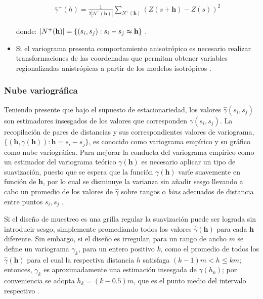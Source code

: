 \documentclass[
]{book}
\begin{document}
\begin{itemize}
  \begin{align}
      \bar{\gamma}^+(h)=\frac{1}{2|N^+(\textbf{h})|}\sum_{N^+(\textbf{h})}(Z(s+\textbf{h})-Z(s))^2  
    \end{align}

  donde: \(|N^+(\textbf{h})|=\{(s_i,s_j): s_i-s_j \thickapprox \textbf{h}\}\) \citep{montero}.
\item
  Si el variograma presenta comportamiento anisotrópico es necesario realizar transformaciones de las coordenadas que permitan obtener variables regionalizadas anistrópicas a partir de los modelos isotrópicos \citep{hans}.
\end{itemize}

\hypertarget{nube-variogruxe1fica}{%
\subsubsection*{Nube variográfica}\label{nube-variogruxe1fica}}

Teniendo presente que bajo el supuesto de estacionariedad, los valores \(\hat{\gamma}(s_i,s_j)\) son estimadores insesgados de los valores que corresponden \(\gamma(s_i,s_j)\). La recopilación de pares de distancias y sus correspondientes valores de variograma, \(\{(\textbf{h},\gamma(\textbf{h})): \textbf{h}=s_i-s_j\}\), es conocido como variograma empírico y su gráfico como nube variográfica. Para mejorar la conducta del variograma empírico como un estimador del variograma teórico \(\gamma(\textbf{h})\) es necesario aplicar un tipo de suavización, puesto que se espera que la función \(\gamma(\textbf{h})\) varíe suavemente en función de \(\textbf{h}\), por lo cual se disminuye la varianza sin añadir sesgo llevando a cabo un promedio de los valores de \(\hat{\gamma}\) sobre rangos o \textit{bins} adecuados de distancia entre puntos \(s_i,s_j\) \citep{peter}.

Si el diseño de muestreo es una grilla regular la suavización puede ser lograda sin introducir sesgo, simplemente promediando todos los valores \(\hat{\gamma}(\textbf{h})\) para cada \(\textbf{h}\) diferente. Sin embargo, si el diseño es irregular, para un rango de ancho \(m\) se define un variograma \(\gamma_k\), para un entero positivo \(k\), como el promedio de todos los \(\hat{\gamma}(\textbf{h})\) para el cual la respectiva distancia \(h\) satisfaga \((k-1)m<h\leq km\); entonces, \(\gamma_k\) es aproximadamente una estimación insesgada de \(\gamma(h_k)\); por conveniencia se adopta \(h_k=(k-0.5)m\), que es el punto medio del intervalo respectivo \citep{peter}.
\end{document}
